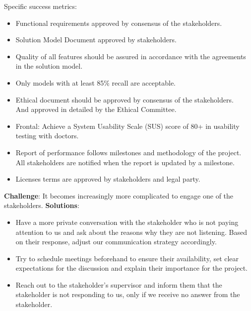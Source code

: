 Specific success metrics:

\begin{itemize}
    \item Functional requirements approved by consensus of the stakeholders.
    \item Solution Model Document approved by stakeholders.
    \item Quality of all features should be assured in accordance with the agreements in the solution model.
    \item Only models with at least 85\% recall are acceptable.
    \item Ethical document should be approved by consensus of the stakeholders. \\
    And approved in detailed by the Ethical Committee.
    \item Frontal: Achieve a System Usability Scale (SUS) score of 80+ in usability testing with doctors.
    \item Report of performance follows milestones and methodology of the project. \\
    All stakeholders are notified when the report is updated by a milestone.
    \item Licenses terms are approved by stakeholders and legal party.
\end{itemize}

\begin{warning}
    \textbf{Challenge}: It becomes increasingly more complicated to engage one of the stakeholders.
    \textbf{Solutions}:
    \begin{itemize}
        \item Have a more private conversation with the stakeholder who is not paying attention to us and ask about the reasons why they are not listening. Based on their response, adjust our communication strategy accordingly.
        \item Try to schedule meetings beforehand to ensure their availability, set clear expectations for the discussion and explain their importance for the project.
        \item Reach out to the stakeholder's supervisor and inform them that the stakeholder is not responding to us, only if we receive no answer from the stakeholder.
    \end{itemize}
\end{warning}



